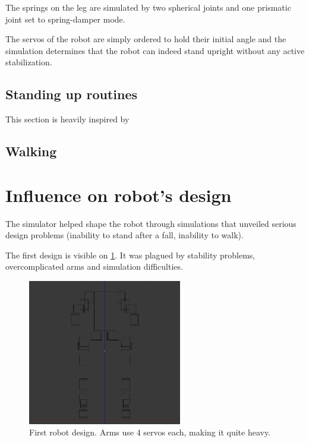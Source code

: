 The springs on the leg are simulated by two spherical joints and one prismatic joint set to spring-damper mode.

The servos of the robot are simply ordered to hold their initial angle and the simulation determines that the robot can indeed stand upright without any active stabilization.

\subsection{Standing up routines}
This section is heavily inspired by \cite{Stuckler06}

\subsection{Walking}

\section{Influence on robot's design}
The simulator helped shape the robot through simulations that unveiled serious design problems (inability to stand after a fall, inability to walk).

The first design is visible on \cref{fig:first_robot}. It was plagued by stability problems, overcomplicated arms and simulation difficulties. 
\begin{figure}[htp]
\center
\includegraphics[width=0.6\textwidth]{figures/robot1}
\caption[Initial robot design]{First robot design. Arms use 4 servos each, making it quite heavy.}
\label{fig:first_robot}
\end{figure}

